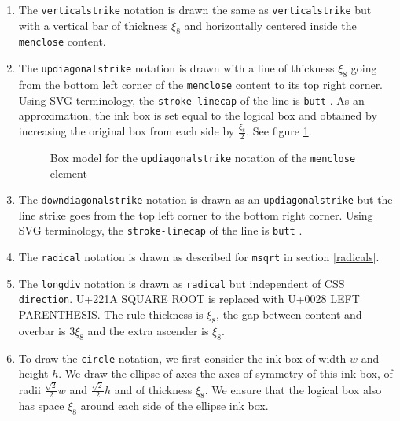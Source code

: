 \begin{enumerate}
\item The {\tt verticalstrike} notation is drawn the same as
  {\tt verticalstrike} but with a vertical bar
  of thickness $\xi_8$ and horizontally centered inside the {\tt menclose}
  content.
\item The {\tt updiagonalstrike} notation is drawn with a line
  of thickness $\xi_8$  going from the bottom left corner of the {\tt menclose}
  content to its top right corner. Using SVG terminology, the
  {\tt stroke-linecap} of the line is {\tt butt} \cite{SVG11}.
  As an approximation, the ink box
  is set equal to the logical box and obtained by increasing the original box
  from each side by $\frac{\xi_8}{2}$.
  See figure \ref{fig:MencloseUpDiagonalStrikeBoxModel}.

  \begin{figure}
\centering
{}
  \caption{Box model for the {\tt updiagonalstrike}
    notation of the {\tt menclose} element}
\label{fig:MencloseUpDiagonalStrikeBoxModel}
\end{figure}

\item The {\tt downdiagonalstrike} notation is drawn as an
  {\tt updiagonalstrike}
  but the line strike goes from the top left corner to the bottom right corner.
  Using SVG terminology, the
  {\tt stroke-linecap} of the line is {\tt butt} \cite{SVG11}.
\item The {\tt radical} notation is drawn as described for {\tt msqrt}
  in section \ref{radicals}.
\item The {\tt longdiv} notation is drawn as {\tt radical} but independent
  of CSS {\tt direction}. U+221A SQUARE ROOT is replaced with
  U+0028 LEFT PARENTHESIS. The rule thickness is $\xi_8$,
  the gap between content and overbar is $3\xi_8$ and the extra ascender
  is $\xi_8$.
\item  To draw the {\tt circle} notation, we first consider the ink box of
  width $w$ and height $h$. We draw the ellipse
  of axes the axes of symmetry of this ink box, of radii
  $\frac{\sqrt{2}}{2} w$ and $\frac{\sqrt{2}}{2} h$ and of thickness $\xi_8$.
  We ensure that the logical box also has space $\xi_8$ around each side
  of the ellipse ink box.
  \begin{figure}
\centering
\begin{tikzpicture}[yscale=-1]


\end{tikzpicture}
\end{figure}
\end{enumerate}
